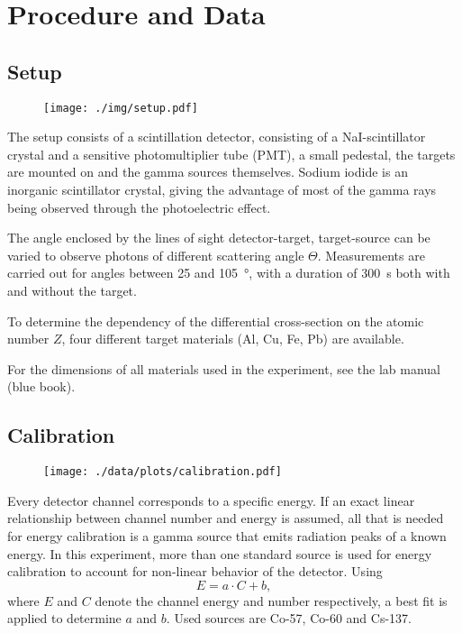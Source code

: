 \chapter{Procedure and Data}

\section{Setup}
\begin{figure}
	\centering
	\texttt{[image: ./img/setup.pdf]}
	\label{fig:setup}
\end{figure}
The setup consists of a scintillation detector, consisting of a NaI-scintillator crystal and a sensitive photomultiplier tube (PMT), a small pedestal, the targets are mounted on and the gamma sources themselves.
Sodium iodide is an inorganic scintillator crystal, giving the advantage of most of the gamma rays being observed through the photoelectric effect.

The angle enclosed by the lines of sight detector-target, target-source can be varied to observe photons of different scattering angle $\Theta$.
Measurements are carried out for angles between \num{25} and \SI{105}{\degree}, with a duration of \SI{300}{\second} both with and without the target.

To determine the dependency of the differential cross-section on the atomic number $Z$, four different target materials (Al, Cu, Fe, Pb) are available.

For the dimensions of all materials used in the experiment, see the lab manual (blue book).

\section{Calibration}
\begin{figure}
	\centering
	\texttt{[image: ./data/plots/calibration.pdf]}
	\label{fig:calib}
\end{figure}
Every detector channel corresponds to a specific energy.
If an exact linear relationship between channel number and energy is assumed, all that is needed for energy calibration is a gamma source that emits radiation peaks of a known energy.
In this experiment, more than one standard source is used for energy calibration to account for non-linear behavior of the detector.
Using
\begin{equation*}
	E = a\cdot C + b,
\end{equation*}
where $E$ and $C$ denote the channel energy and number respectively, a best fit is applied to determine $a$ and $b$.
Used sources are Co-57, Co-60 and Cs-137.

